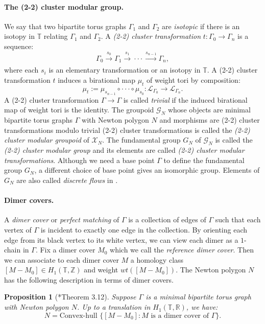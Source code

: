 \documentclass[11pt]{article} %
\newtheorem{proposition}[theorem]{Proposition}
\theoremstyle{definition}
\newcommand{\Z}{{\mathbb Z}}
\newcommand{\R}{{\mathbb R}}
\newcommand{\T}{{\mathbb T}}
\newcommand{\ra}{\rightarrow}
\begin{document}
\paragraph{The (2-2) cluster modular group.}
We say that two bipartite torus graphs $\Gamma_1$ and $\Gamma_2$ are \textit{isotopic} if there is an isotopy in $\T$ relating $\Gamma_1$ and $\Gamma_2$. 
A \textit{(2-2) cluster transformation} $t:\Gamma_0 \ra \Gamma_n$ is a sequence:
$$
\Gamma_0 \xrightarrow[]{s_0} \Gamma_1 \xrightarrow[]{s_1} \cdot \cdot \cdot \xrightarrow[]{s_{n-1}} \Gamma_n,
$$
where each $s_i$ is an elementary transformation or an isotopy in $\T$. A (2-2) cluster transformation $t$ induces a birational map $\mu_t$ of weight tori by composition:
$$
\mu_t:= \mu_{s_{n-1}} \circ \cdot \cdot \cdot \circ \mu_{s_0}:\mathcal L_{\Gamma_0} \ra \mathcal L_{\Gamma_n}. 
$$
A (2-2) cluster transformation $\Gamma \ra \Gamma $ is called \textit{trivial} if the induced birational map of weight tori is the identity. The groupoid $\mathcal G_N$ whose objects are minimal bipartite torus graphs $\Gamma$ with Newton polygon $N$ and morphisms are (2-2) cluster transformations modulo trivial (2-2) cluster transformations is called the \textit{(2-2) cluster modular groupoid} of $\mathcal X_N$. The fundamental group $G_{N}$ of $\mathcal G_{N}$ is called the \textit{(2-2) cluster modular group} and its elements are called \textit{(2-2) cluster modular transformations}. Although we need a base point $\Gamma$ to define the fundamental group $G_N$, a different choice of base point gives an isomorphic group. Elements of $G_N$ are also called \textit{discrete flows} in \cite{FM16}.

\paragraph{Dimer covers.} A \textit{dimer cover} or \textit{perfect matching} of $\Gamma$ is a collection of edges of $\Gamma$ such that each vertex of $\Gamma$ is incident to exactly one edge in the collection. By orienting each edge from its black vertex to its white vertex, we can view each dimer as a $1$-chain in $\Gamma$. Fix a dimer cover $M_0$ which we call the \textit{reference dimer cover}. Then we can associate to each dimer cover $M$ a homology class $[M-M_0] \in H_1(\T,\Z)$ and weight $wt([M-M_0])$. The Newton polygon $N$ has the following description in terms of dimer covers.

\begin{proposition}[\cite{GK12}*{Theorem 3.12}]\label{nplemma}
Suppose $\Gamma$ is a minimal bipartite torus graph with Newton polygon $N$. Up to a translation in $H_1(\T,\R)$, we have:
$$
N=\text{Convex-hull }\{ [M-M_0]: M \text{ is a dimer cover of $\Gamma$}\}.
$$
\end{proposition}
\end{document}
